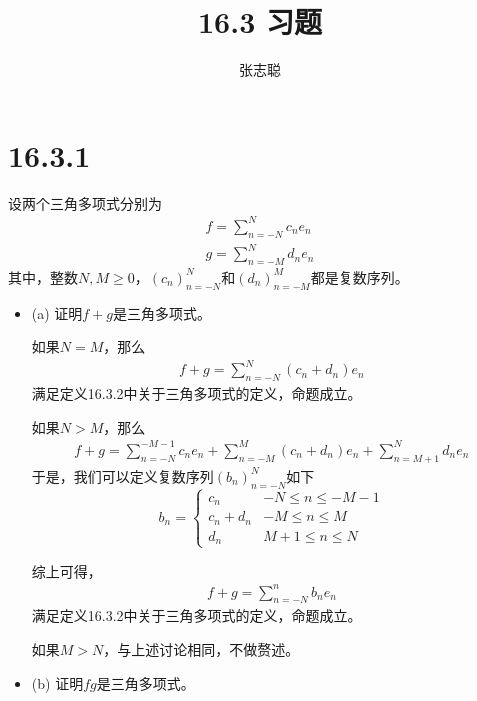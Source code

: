 \documentclass{article}
\begin{document}
\title{16.3 习题}
\author{张志聪}
\maketitle

\section*{16.3.1}

设两个三角多项式分别为
\begin{align*}
  f = \sum \limits_{n = - N}^N c_n e_n \\
  g = \sum \limits_{n = - M}^N d_n e_n
\end{align*}
其中，整数$N, M \geq 0$，$(c_n)_{n = - N}^N$和$(d_n)_{n = - M}^M$都是复数序列。

\begin{itemize}
  \item (a) 证明$f + g$是三角多项式。

        如果$N = M$，那么
        \begin{align*}
          f + g = \sum \limits_{n = - N}^N (c_n + d_n) e_n
        \end{align*}
        满足定义16.3.2中关于三角多项式的定义，命题成立。

        如果$N > M$，那么
        \begin{align*}
          f + g = \sum \limits_{n = - N}^{-M-1} c_n e_n
          + \sum \limits_{n = - M}^{M} (c_n + d_n) e_n
          + \sum \limits_{n = M+1}^{N} d_n e_n
        \end{align*}
        于是，我们可以定义复数序列$(b_n)_{n = -N}^N$如下
        \begin{equation*}
          b_n = \begin{cases}
            c_n       & -N \leq n \leq -M-1 \\
            c_n + d_n & -M \leq n \leq M    \\
            d_n       & M + 1 \leq n \leq N
          \end{cases}
        \end{equation*}

        综上可得，
        \begin{align*}
          f + g = \sum\limits_{n = -N}^n b_n e_n
        \end{align*}
        满足定义16.3.2中关于三角多项式的定义，命题成立。

        如果$M > N$，与上述讨论相同，不做赘述。

  \item (b) 证明$fg$是三角多项式。


\end{itemize}
\end{document}
